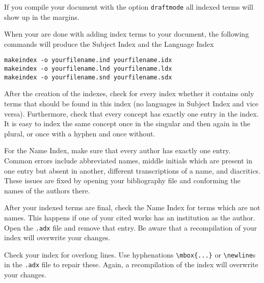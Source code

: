 If you compile your document with the option \verb+draftmode+ all indexed terms will show up in the margins.

When your are done with adding index terms to your document, the following commands will produce the Subject Index and the Language Index
\begin{verbatim}
makeindex -o yourfilename.ind yourfilename.idx
makeindex -o yourfilename.lnd yourfilename.ldx
makeindex -o yourfilename.snd yourfilename.sdx
\end{verbatim}
 

After the creation of the indexes, check for every index whether it contains only terms that should be found in this index (no languages in Subject Index and vice versa). Furthermore, check that every concept has exactly one entry in the index. It is easy to index the same concept once in the singular and then again in the plural, or once with a hyphen and once without. 

For the Name Index, make sure that every author has exactly one entry. Common errors include abbreviated names, middle initials which are present in one entry but absent in another, different transcriptions of a name, and diacritics. These issues are fixed by opening your bibliography file and conforming the names of the authors there.

After your indexed terms are final, check the Name Index for terms which are not names. This happens if one of your cited works has an institution as the author. Open the \verb+.adx+ file and remove that entry. Be aware that a recompilation of your index will overwrite your changes.

Check your index for overlong lines. Use hyphenations \verb+\mbox{...}+ or \verb+\newline+s in the \verb+.adx+ file to repair these. Again, a recompilation of the index will overwrite your changes.
